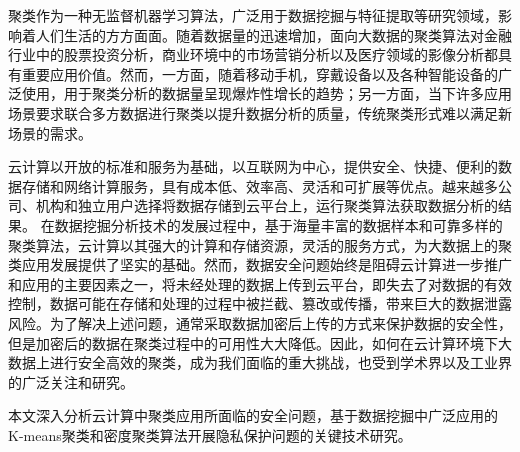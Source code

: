 \begin{cabstract}
%

聚类作为一种无监督机器学习算法，广泛用于数据挖掘与特征提取等研究领域，影响着人们生活的方方面面。随着数据量的迅速增加，面向大数据的聚类算法对金融行业中的股票投资分析，商业环境中的市场营销分析以及医疗领域的影像分析都具有重要应用价值。然而，一方面，随着移动手机，穿戴设备以及各种智能设备的广泛使用，用于聚类分析的数据量呈现爆炸性增长的趋势；另一方面，当下许多应用场景要求联合多方数据进行聚类以提升数据分析的质量，传统聚类形式难以满足新场景的需求。

云计算以开放的标准和服务为基础，以互联网为中心，提供安全、快捷、便利的数据存储和网络计算服务，具有成本低、效率高、灵活和可扩展等优点。越来越多公司、机构和独立用户选择将数据存储到云平台上，运行聚类算法获取数据分析的结果。
在数据挖掘分析技术的发展过程中，基于海量丰富的数据样本和可靠多样的聚类算法，云计算以其强大的计算和存储资源，灵活的服务方式，为大数据上的聚类应用发展提供了坚实的基础。然而，数据安全问题始终是阻碍云计算进一步推广和应用的主要因素之一，将未经处理的数据上传到云平台，即失去了对数据的有效控制，数据可能在存储和处理的过程中被拦截、篡改或传播，带来巨大的数据泄露风险。为了解决上述问题，通常采取数据加密后上传的方式来保护数据的安全性，但是加密后的数据在聚类过程中的可用性大大降低。因此，如何在云计算环境下大数据上进行安全高效的聚类，成为我们面临的重大挑战，也受到学术界以及工业界的广泛关注和研究。

本文深入分析云计算中聚类应用所面临的安全问题，基于数据挖掘中广泛应用的K-means聚类和密度聚类算法开展隐私保护问题的关键技术研究。


\end{cabstract}

